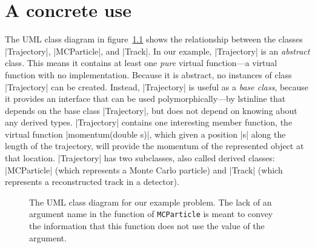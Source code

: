 \documentclass[letterpaper,10pt,article]{memoir}
\begin{document}
\chapter{A concrete use\label{ch:concrete-use}}
The UML class diagram in figure~\ref{fig:prongdiagram} shows the
relationship between the classes |Trajectory|, |MCParticle|, and
|Track|. In our example, |Trajectory| is an \emph{abstract}
class. This means it contains at least one \emph{pure} virtual
function---a virtual function with no implementation. Because it is
abstract, no instances of class |Trajectory| can be created. Instead,
|Trajectory| is useful as a \emph{base class}, because it provides an
interface that can be used polymorphically---by lstinline that depends on
the base class |Trajectory|, but does not depend on knowing about any
derived types. |Trajectory| contains one interesting member function,
the virtual function |momentum(double s)|, which given a position |s|
along the length of the trajectory, will provide the momentum of the
represented object at that location. |Trajectory| has two subclasses,
also called derived classes: |MCParticle| (which represents a Monte
Carlo particle) and |Track| (which represents a reconstructed track in
a detector).
\begin{figure}[!ht]
  \centering
  \caption{The UML class diagram for our example problem. The lack of
    an argument name in the function of \lstinline{MCParticle} is meant to
    convey the information that this function does not use the value of the argument.}
  \label{fig:prongdiagram}
\end{figure}

\appendix

\end{document}
